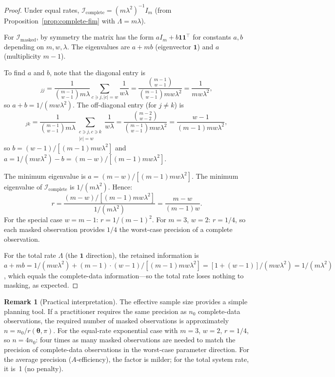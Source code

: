 \documentclass[11pt]{article}
\theoremstyle{definition}
\newtheorem{remark}{Remark}
\theoremstyle{plain}
\renewcommand{\v}[1]{\boldsymbol{#1}}
\newcommand{\btheta}{\v{\theta}}
\newcommand{\FI}{\mathcal{I}}       %
\begin{document}
\begin{proof}
Under equal rates, $\FI_{\mathrm{complete}} = (m\lambda^2)^{-1} I_m$
(from Proposition~\ref{prop:complete-fim} with $\Lambda = m\lambda$).

For $\FI_{\mathrm{masked}}$, by symmetry the matrix has the form
$aI_m + b\v{1}\v{1}^\top$ for constants $a, b$ depending on $m, w, \lambda$.
The eigenvalues are $a + mb$ (eigenvector $\v{1}$) and $a$ (multiplicity
$m - 1$).

To find $a$ and $b$, note that the diagonal entry is
\begin{equation}
    [\FI_{\mathrm{masked}}]_{jj}
    = \frac{1}{\binom{m-1}{w-1} m\lambda}
    \sum_{c \ni j, |c|=w} \frac{1}{w\lambda}
    = \frac{\binom{m-1}{w-1}}{\binom{m-1}{w-1} m w \lambda^2}
    = \frac{1}{mw\lambda^2},
\end{equation}
so $a + b = 1/(mw\lambda^2)$.
The off-diagonal entry (for $j \neq k$) is
\begin{equation}
    [\FI_{\mathrm{masked}}]_{jk}
    = \frac{1}{\binom{m-1}{w-1} m\lambda}
    \sum_{\substack{c \ni j, c \ni k \\ |c|=w}} \frac{1}{w\lambda}
    = \frac{\binom{m-2}{w-2}}{\binom{m-1}{w-1} mw\lambda^2}
    = \frac{w-1}{(m-1)mw\lambda^2},
\end{equation}
so $b = (w-1)/[(m-1)mw\lambda^2]$ and
$a = 1/(mw\lambda^2) - b = (m-w)/[(m-1)mw\lambda^2]$.

The minimum eigenvalue is $a = (m-w)/[(m-1)mw\lambda^2]$.
The minimum eigenvalue of $\FI_{\mathrm{complete}}$ is $1/(m\lambda^2)$.
Hence:
\begin{equation}
    r = \frac{(m-w)/[(m-1)mw\lambda^2]}{1/(m\lambda^2)}
    = \frac{m-w}{(m-1)w}.
\end{equation}
For the special case $w = m - 1$: $r = 1/(m-1)^2$.
For $m = 3$, $w = 2$: $r = 1/4$, so each masked observation
provides $1/4$ the worst-case precision of a complete observation.

For the total rate $\Lambda$ (the $\v{1}$ direction), the retained
information is $a + mb = 1/(mw\lambda^2) + (m-1) \cdot (w-1)/[(m-1)mw\lambda^2]
= [1 + (w-1)]/(mw\lambda^2) = 1/(m\lambda^2)$, which equals the
complete-data information---so the total rate loses nothing to masking,
as expected.
\end{proof}

\begin{remark}[Practical interpretation]
\label{rem:ess-practical}
The effective sample size provides a simple planning tool.
If a practitioner requires the same precision as $n_0$ complete-data
observations, the required number of masked observations is approximately
$n = n_0 / r(\btheta, \pi)$.
For the equal-rate exponential case with $m = 3$, $w = 2$,
$r = 1/4$, so $n = 4 n_0$: four times as many masked observations
are needed to match the precision of complete-data observations in
the worst-case parameter direction.
For the average precision ($A$-efficiency), the factor is milder;
for the total system rate, it is~1 (no penalty).
\end{remark}
\end{document}
